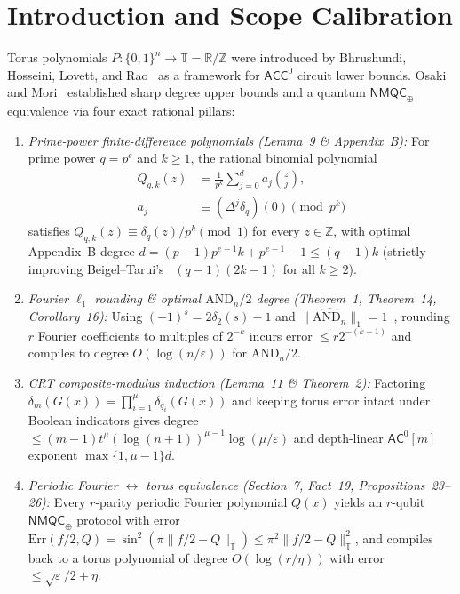 \documentclass[10pt,twocolumn]{article}
\newcommand{\ZZ}{\mathbb{Z}}
\newcommand{\RR}{\mathbb{R}}
\newcommand{\TT}{\mathbb{T}}
\begin{document}
\section{Introduction and Scope Calibration}
Torus polynomials $P : \{0,1\}^n \to \TT = \RR/\ZZ$ were introduced by Bhrushundi, Hosseini, Lovett, and Rao~\cite{bhrushundi2019torus} as a framework for $\mathsf{ACC}^0$ circuit lower bounds. Osaki and Mori~\cite{osaki2026torus} established sharp degree upper bounds and a quantum $\mathsf{NMQC}_\oplus$ equivalence via four exact rational pillars:
\begin{enumerate}[leftmargin=1.2em,itemsep=1pt,topsep=2pt]
  \item \emph{Prime-power finite-difference polynomials (Lemma~9 \& Appendix~B):} For prime power $q = p^e$ and $k \ge 1$, the rational binomial polynomial
  \begin{equation}
  \begin{aligned}
    Q_{q,k}(z) &= \frac{1}{p^k} \sum_{j=0}^{d} a_j \binom{z}{j}, \\
    a_j &\equiv (\Delta^j \delta_q)(0) \pmod{p^k}
  \end{aligned}
    \label{eq:lemma9}
  \end{equation}
  satisfies $Q_{q,k}(z) \equiv \delta_q(z)/p^k \pmod 1$ for every $z \in \ZZ$, with optimal Appendix~B degree $d = (p-1)p^{e-1}k + p^{e-1} - 1 \le (q-1)k$ (strictly improving Beigel--Tarui's~\cite{beigel1994acc} $(q-1)(2k-1)$ for all $k\ge 2$).
  \item \emph{Fourier $\ell_1$ rounding \& optimal $\mathrm{AND}_n/2$ degree (Theorem~1, Theorem~14, Corollary~16):} Using $(-1)^s = 2\delta_2(s)-1$ and $\|\widehat{\mathrm{AND}_n}\|_1 = 1$~\cite{odonnell2014analysis}, rounding $r$ Fourier coefficients to multiples of $2^{-k}$ incurs error $\le r 2^{-(k+1)}$ and compiles to degree $O(\log(n/\varepsilon))$ for $\mathrm{AND}_n/2$.
  \item \emph{CRT composite-modulus induction (Lemma~11 \& Theorem~2):} Factoring $\delta_m(G(x)) = \prod_{i=1}^\mu \delta_{q_i}(G(x))$ and keeping torus error intact under Boolean indicators gives degree $\le (m-1)t^\mu (\log(n+1))^{\mu-1}\log(\mu/\varepsilon)$ and depth-linear $\mathsf{AC}^0[m]$ exponent $\max\{1,\mu-1\}d$.
  \item \emph{Periodic Fourier $\leftrightarrow$ torus equivalence (Section~7, Fact~19, Propositions~23--26):} Every $r$-parity periodic Fourier polynomial $Q(x)$ yields an $r$-qubit $\mathsf{NMQC}_\oplus$ protocol with error $\mathrm{Err}(f/2, Q) = \sin^2(\pi\|f/2 - Q\|_\TT) \le \pi^2 \|f/2 - Q\|_\TT^2$, and compiles back to a torus polynomial of degree $O(\log(r/\eta))$ with error $\le \sqrt{\varepsilon}/2 + \eta$.
\end{enumerate}
\end{document}
